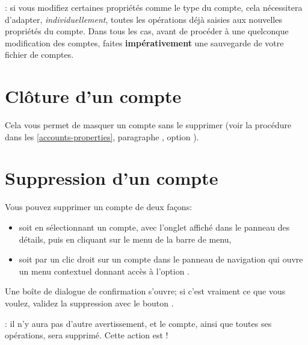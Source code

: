 

\Attention{}: si vous modifiez certaines propriétés comme le type du compte, cela nécessitera d'adapter, \emph{individuellement}, toutes les opérations déjà saisies aux nouvelles propriétés du compte. Dans tous les cas, avant de procéder à une quelconque modification des comptes, faites \textbf{impérativement} une sauvegarde de votre fichier de comptes.

\section{Clôture d'un compte\label{accounts-closure}}

Cela vous permet de masquer un compte sans le supprimer (voir la procédure dans les  \vref{accounts-properties}, paragraphe , option ).


\section{Suppression d'un compte\label{accounts-delete}}

Vous pouvez supprimer un compte de deux façons:
\begin{itemize}
	\item soit en sélectionnant un compte, avec l'onglet  affiché dans le panneau des détails, puis en cliquant sur le menu  de la barre de menu,
	\item soit par un clic droit sur un compte dans le panneau de navigation qui ouvre un menu contextuel donnant accès à l'option .
\end{itemize}

Une boîte de dialogue de confirmation s'ouvre; si c'est vraiment ce que vous voulez, validez la suppression avec le bouton .

\Attention{}: il n'y aura pas d'autre avertissement, et le compte, ainsi que toutes ses opérations, sera supprimé. Cette action est !


